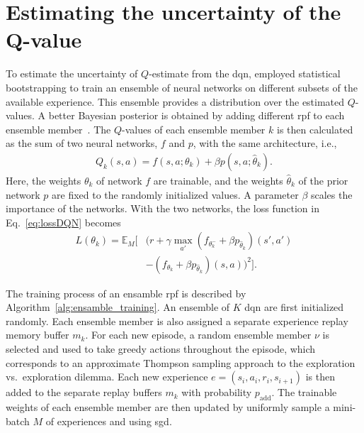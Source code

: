 \section{Estimating the uncertainty of the Q-value}
\label{ch:ensamble}
To estimate the uncertainty of $Q$-estimate from the \gls{dqn}, \paperEnsamble employed statistical bootstrapping to train an ensemble of neural networks on different subsets of the available experience. This ensemble provides a distribution over the estimated $Q$-values. A better Bayesian posterior is obtained by adding different \gls{rpf} to each ensemble member~\cite{Osband2018}.
The $Q$-values of each ensemble member $k$ is then calculated as the sum of two neural networks, $f$ and $p$, with the same architecture, i.e.,
%
\begin{align}
	Q_k(s,a) = f(s,a;\theta_k) + \beta p(s,a;\hat{\theta}_k).
\end{align}
Here, the weights $\theta_k$ of network $f$ are trainable, and the weights $\hat{\theta}_k$ of the prior network $p$ are fixed to the randomly initialized values. A parameter $\beta$ scales the importance of the networks. With the two networks, the loss function in Eq.~\ref{eq:lossDQN} becomes
%
\begin{align}
	\label{eq:loss_boot}
	L(\theta_k) = \mathbb{E}_M \Big[ & (r + \gamma \max_{a'} (f_{\theta^-_k}+\beta p_{\hat{\theta}_k})(s',a') \nonumber \\
	& - (f_{\theta_k}+ \beta p_{\hat{\theta}_k})(s,a) )^2 \Big].
\end{align} 

%

The training process of an ensamble \gls{rpf} is described by Algorithm~\ref{alg:ensamble_training}. 
An ensemble of $K$ \gls{dqn} are first initialized randomly. Each ensemble member is also assigned a separate experience replay memory buffer $m_k$. 
For each new episode, a random ensemble member $\nu$ is selected and used to take greedy actions throughout the episode, which corresponds to an approximate Thompson sampling approach to the exploration vs.~exploration dilemma.
Each new experience $e = (s_i, a_i, r_i, s_{i+1})$ is then added to the separate replay buffers $m_k$ with probability $p_\mathrm{add}$. The trainable weights of each ensemble member are then updated by uniformly sample a mini-batch $M$ of experiences and using \gls{sgd}.

